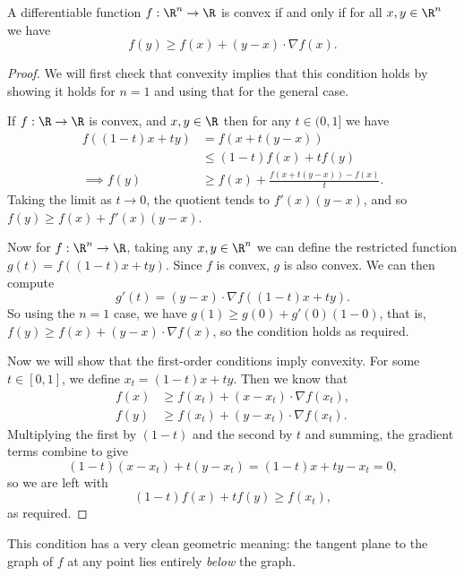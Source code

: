 \begin{proposition}
A differentiable function $f: \R^n \rightarrow \R$ is convex if and only if for all $x, y \in \R^n$ we have
$$
f(y) \geq f(x) + (y - x) \cdot \nabla f(x).
$$
\end{proposition}
\begin{proof}
    We will first check that convexity implies that this condition holds by showing it holds for $n = 1$ and using that for the general case.

    If $f: \R \rightarrow \R$ is convex, and $x, y \in \R$ then for any $t \in (0, 1]$ we have
    \begin{align*}
        f((1 - t)x + ty) &= f(x + t(y - x)) \\
        & \leq (1 - t)f(x) + tf(y) \\
\implies f(y) & \geq f(x) + \frac{f(x + t(y - x)) - f(x)}{t}.
    \end{align*}
    Taking the limit as $t \rightarrow 0$, the quotient tends to $f'(x)(y - x)$, and so $f(y) \geq f(x) + f'(x)(y - x)$.

    Now for $f: \R^n \rightarrow \R$, taking any $x, y \in \R^n$ we can define the restricted function $g(t) = f((1 - t)x + ty)$. Since $f$ is convex, $g$ is also convex. We can then compute
    $$
    g'(t) = (y - x) \cdot \nabla f((1 - t) x + ty).
    $$
    So using the $n = 1$ case, we have $g(1) \geq g(0) + g'(0) (1 - 0)$, that is, $f(y) \geq f(x) + (y - x) \cdot \nabla f(x)$, so the condition holds as required.

    Now we will show that the first-order conditions imply convexity.
    For some $t \in [0, 1]$, we define $x_t = (1 - t) x + ty$. Then we know that
    \begin{align*}
        f(x) &\geq f(x_t) + (x - x_t) \cdot \nabla f(x_t), \\
        f(y) &\geq f(x_t) + (y - x_t) \cdot \nabla f(x_t).
    \end{align*}
    Multiplying the first by $(1 - t)$ and the second by $t$ and summing, the gradient terms combine to give
    $$
    (1-t)(x - x_t) + t(y - x_t) = (1-t)x + ty - x_t = 0,
    $$
    so we are left with
    $$
    (1 - t)f(x) + tf(y) \geq f(x_t),
    $$
    as required.
\end{proof}

This condition has a very clean geometric meaning: the tangent plane to the graph of $f$ at any point lies entirely \emph{below} the graph.

\begin{center}
\end{center}

